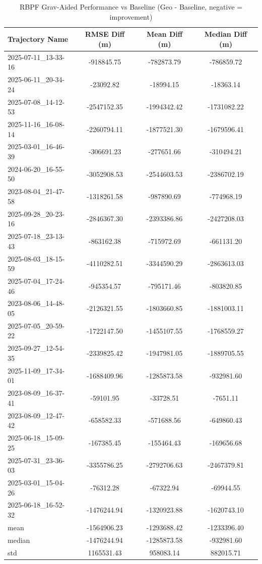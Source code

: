 \begin{table}[h]
    \centering
    \caption{RBPF Grav-Aided Performance vs Baseline (Geo - Baseline, negative = improvement)}
    \begin{tabular}{ || l || c c c || }
    \toprule
    Trajectory Name & RMSE Diff (m) & Mean Diff (m) & Median Diff (m) \\
    \midrule
    2025-07-11\_13-33-16 & -918845.75 & -782873.79 & -786859.72 \\
    2025-06-11\_20-34-24 & -23092.82 & -18994.15 & -18363.14 \\
    2025-07-08\_14-12-53 & -2547152.35 & -1994342.42 & -1731082.22 \\
    2025-11-16\_16-08-14 & -2260794.11 & -1877521.30 & -1679596.41 \\
    2025-03-01\_16-46-39 & -306691.23 & -277651.66 & -310494.21 \\
    2024-06-20\_16-55-50 & -3052908.53 & -2544603.53 & -2386702.19 \\
    2023-08-04\_21-47-58 & -1318261.58 & -987890.69 & -774968.19 \\
    2025-09-28\_20-23-16 & -2846367.30 & -2393386.86 & -2427208.03 \\
    2025-07-18\_23-13-43 & -863162.38 & -715972.69 & -661131.20 \\
    2025-08-03\_18-15-59 & -4110282.51 & -3344590.29 & -2863613.03 \\
    2025-07-04\_17-24-46 & -945354.57 & -795171.46 & -803820.85 \\
    2023-08-06\_14-48-05 & -2126321.55 & -1803660.85 & -1881003.11 \\
    2025-07-05\_20-59-22 & -1722147.50 & -1455107.55 & -1768559.27 \\
    2025-09-27\_12-54-35 & -2339825.42 & -1947981.05 & -1889705.55 \\
    2025-11-09\_17-34-01 & -1688409.96 & -1285873.58 & -932981.60 \\
    2023-08-09\_16-37-41 & -59101.95 & -33728.51 & -7651.11 \\
    2023-08-09\_12-47-42 & -658582.33 & -571688.56 & -649860.43 \\
    2025-06-18\_15-09-25 & -167385.45 & -155464.43 & -169656.68 \\
    2025-07-31\_23-36-03 & -3355786.25 & -2792706.63 & -2467379.81 \\
    2025-03-01\_15-04-26 & -76312.28 & -67322.94 & -69944.55 \\
    2025-06-18\_16-52-32 & -1476244.94 & -1320923.88 & -1620743.10 \\
    \midrule
    mean & -1564906.23 & -1293688.42 & -1233396.40 \\
    median & -1476244.94 & -1285873.58 & -932981.60 \\
    std & 1165531.43 & 958083.14 & 882015.71 \\
    \bottomrule
    \end{tabular}
    \label{tab:rbpf_grav_results}
\end{table}